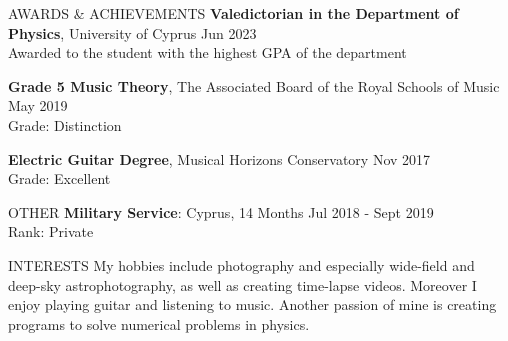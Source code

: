 \documentclass{resume} %
\begin{document}
        \bigbreak

        \begin{rSection}{AWARDS \& ACHIEVEMENTS}
                {\bf Valedictorian in the Department of Physics}, University of Cyprus \hfill Jun 2023\\
                Awarded to the student with the highest GPA of the department
                
                {\bf Grade 5 Music Theory}, The Associated Board of the Royal Schools of Music \hfill May 2019\\
                Grade: Distinction
                
                {\bf Electric Guitar Degree}, Musical Horizons Conservatory \hfill Nov 2017\\
                Grade: Excellent
        \end{rSection} 

        \bigbreak

        \begin{rSection}{OTHER}
                {\bf Military Service}: Cyprus, 14 Months \hfill {Jul 2018 - Sept 2019}\\
                Rank: Private
        \end{rSection}

        \bigbreak

        \begin{rSection}{INTERESTS} 
                My hobbies include photography and especially wide-field and deep-sky astrophotography, as well as creating time-lapse videos.
                Moreover I enjoy playing guitar and listening to music.
                Another passion of mine is creating programs to solve numerical problems in physics.
        \end{rSection}
\end{document}
